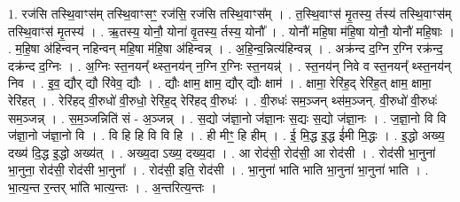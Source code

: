 \documentclass[17pt]{extarticle}
\begin{document}
1. रज॑सि तस्थि॒वाꣳस॑म् तस्थि॒वाꣳसꣳ॒॒ रज॑सि॒ रज॑सि तस्थि॒वाꣳस᳚म् । . त॒स्थि॒वाꣳस॑ मृ॒तस्य॒ र्तस्य॑ तस्थि॒वाꣳस॑म् तस्थि॒वाꣳस॑ मृ॒तस्य॑ । . ऋ॒तस्य॒ योनौ॒ योना॑ वृ॒तस्य॒ र्तस्य॒ योनौ᳚ । . योनौ॑ महि॒षा म॑हि॒षा योनौ॒ योनौ॑ महि॒षाः । . म॒हि॒षा अ॑हिन्वन् नहिन्वन् महि॒षा म॑हि॒षा अ॑हिन्वन्न् । . अ॒हि॒न्व॒न्नित्य॑हिन्वन्न् । . अक्र॑न्द द॒ग्नि र॒ग्नि रक्र॑न्द॒ दक्र॑न्द द॒ग्निः । . अ॒ग्निः स्त॒नयन्᳚ थ्स्त॒नय॑न् न॒ग्नि र॒ग्निः स्त॒नयन्न्॑ । . स्त॒नय॑न् निवे व स्त॒नयन्᳚ थ्स्त॒नय॑न् निव । . इ॒व॒ द्यौर् द्यौ रि॑वेव॒ द्यौः । . द्यौः क्षाम॒ क्षाम॒ द्यौर् द्यौः क्षाम॑ । . क्षामा॒ रेरि॑ह॒द् रेरि॑ह॒त् क्षाम॒ क्षामा॒ रेरि॑हत् । . रेरि॑हद् वी॒रुधो॑ वी॒रुधो॒ रेरि॑ह॒द् रेरि॑हद् वी॒रुधः॑ । . वी॒रुधः॑ सम॒ञ्जन् थ्स॑म॒ञ्जन्. वी॒रुधो॑ वी॒रुधः॑ सम॒ञ्जन्न् । . स॒म॒ञ्जन्निति॑ सं - अ॒ञ्जन्न् । . स॒द्यो ज॑ज्ञा॒नो ज॑ज्ञा॒नः स॒द्यः स॒द्यो ज॑ज्ञा॒नः । . ज॒ज्ञा॒नो वि वि ज॑ज्ञा॒नो ज॑ज्ञा॒नो वि । . वि हि हि वि वि हि । . ही मीꣳ॒॒ हि हीम् । . ई॒ मि॒द्ध इ॒द्ध ई॑मी मि॒द्धः । . इ॒द्धो अख्य॒ दख्य॑ दि॒द्ध इ॒द्धो अख्य॑त् । . अख्य॒दा ऽख्य॒ दख्य॒दा । . आ रोद॑सी॒ रोद॑सी॒ आ रोद॑सी । . रोद॑सी भा॒नुना॑ भा॒नुना॒ रोद॑सी॒ रोद॑सी भा॒नुना᳚ । . रोद॑सी॒ इति॒ रोद॑सी । . भा॒नुना॑ भाति भाति भा॒नुना॑ भा॒नुना॑ भाति । . भा॒त्य॒न्त र॒न्तर् भा॑ति भात्य॒न्तः । . अ॒न्तरित्य॒न्तः । \newline
\end{document}
